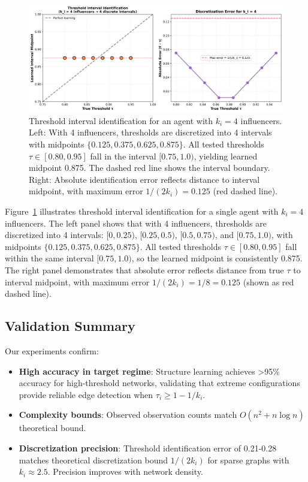 \documentclass[conference]{IEEEtran}
\begin{document}
\begin{figure}[t]
\centering
\includegraphics[width=\linewidth]{threshold_detection.png}
\caption{Threshold interval identification for an agent with $k_i = 4$ influencers. Left: With 4 influencers, thresholds are discretized into 4 intervals with midpoints $\{0.125, 0.375, 0.625, 0.875\}$. All tested thresholds $\tau \in [0.80, 0.95]$ fall in the interval $[0.75, 1.0)$, yielding learned midpoint 0.875. The dashed red line shows the interval boundary. Right: Absolute identification error reflects distance to interval midpoint, with maximum error $1/(2k_i) = 0.125$ (red dashed line).}
\label{fig:threshold}
\end{figure}

Figure~\ref{fig:threshold} illustrates threshold interval identification for a single agent with $k_i = 4$ influencers. The left panel shows that with 4 influencers, thresholds are discretized into 4 intervals: $[0, 0.25)$, $[0.25, 0.5)$, $[0.5, 0.75)$, and $[0.75, 1.0)$, with midpoints $\{0.125, 0.375, 0.625, 0.875\}$. All tested thresholds $\tau \in [0.80, 0.95]$ fall within the same interval $[0.75, 1.0)$, so the learned midpoint is consistently 0.875. The right panel demonstrates that absolute error reflects distance from true $\tau$ to interval midpoint, with maximum error $1/(2k_i) = 1/8 = 0.125$ (shown as red dashed line).

\subsection{Validation Summary}

Our experiments confirm:
\begin{itemize}
\item \textbf{High accuracy in target regime}: Structure learning achieves >95\% accuracy for high-threshold networks, validating that extreme configurations provide reliable edge detection when $\tau_i \geq 1 - 1/k_i$.
\item \textbf{Complexity bounds}: Observed observation counts match $O(n^2 + n \log n)$ theoretical bound.
\item \textbf{Discretization precision}: Threshold identification error of 0.21-0.28 matches theoretical discretization bound $1/(2k_i)$ for sparse graphs with $k_i \approx 2.5$. Precision improves with network density.
\end{itemize}
\end{document}
